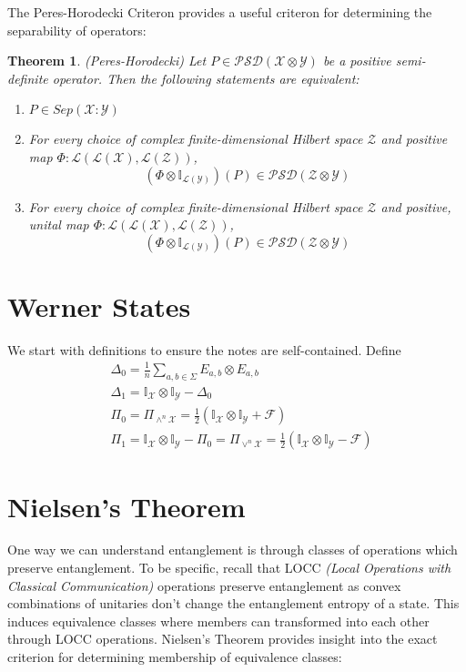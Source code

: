 \documentclass[12pt]{article}
\newcommand{\X}{\mathcal{X}}
\newcommand{\Y}{\mathcal{Y}}
\newcommand{\Z}{\mathcal{Z}}
\newcommand{\LX}{\mathcal{L}(\mathcal{X})}
\newcommand{\LY}{\mathcal{L}(\mathcal{Y})}
\newcommand{\LZ}{\mathcal{L}(\mathcal{Z})}
\newtheorem{theorem}{Theorem}
\begin{document}
The Peres-Horodecki Criteron provides a useful criteron for determining the separability of operators:
\begin{theorem}{(Peres-Horodecki)}
 Let $P \in \mathcal{PSD}(\X \otimes \Y)$ be a positive semi-definite operator. Then the following statements are equivalent:
 \begin{enumerate}
   \item $P \in Sep(\X:\Y)$
   \item For every choice of complex finite-dimensional Hilbert space $\mathcal{Z}$ and positive map $\Phi:\mathcal{L}(\LX, \LZ)$,
         $$ (\Phi \otimes \mathbb{I}_{\LY})(P) \in \mathcal{PSD}(\Z \otimes \Y) $$
  \item  For every choice of complex finite-dimensional Hilbert space $\mathcal{Z}$ and positive, unital map $\Phi:\mathcal{L}(\LX, \LZ)$,
        $$ (\Phi \otimes \mathbb{I}_{\LY})(P) \in \mathcal{PSD}(\Z \otimes \Y) $$
 \end{enumerate}
\end{theorem}

\section{Werner States}
We start with definitions to ensure the notes are self-contained. Define
\begin{align*}
& \Delta_0 = \frac{1}{n}\sum_{a, b \in \Sigma} E_{a,b} \otimes E_{a,b} \\
& \Delta_1 = \mathbb{I}_\X \otimes \mathbb{I}_\Y - \Delta_0 \\
& \Pi_0 = \Pi_{\wedge^n\X} = \frac{1}{2}(\mathbb{I}_\X \otimes \mathbb{I}_\Y + \mathcal{F}) \\
& \Pi_1 = \mathbb{I}_\X \otimes \mathbb{I}_\Y - \Pi_0 = \Pi_{\vee^n\X} = \frac{1}{2}(\mathbb{I}_\X \otimes \mathbb{I}_\Y - \mathcal{F})
\end{align*}

\section{Nielsen's Theorem}
One way we can understand entanglement is through classes of operations which preserve entanglement. To be specific, recall that LOCC \emph{(Local Operations with Classical Communication)} operations preserve entanglement as convex combinations of unitaries don't change the entanglement entropy of a state. This induces equivalence classes where members can transformed into each other through LOCC operations. Nielsen's Theorem provides insight into the exact criterion for determining membership of equivalence classes:
\end{document}
